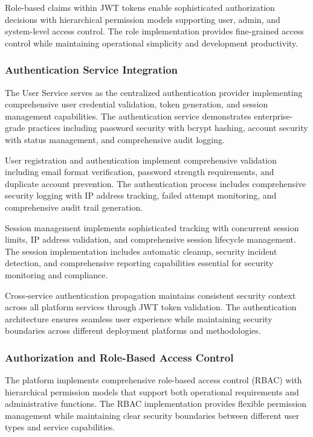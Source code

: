 Role-based claims within JWT tokens enable sophisticated authorization decisions with hierarchical permission models supporting user, admin, and system-level access control. The role implementation provides fine-grained access control while maintaining operational simplicity and development productivity.

\subsubsection{Authentication Service Integration}

The User Service serves as the centralized authentication provider implementing comprehensive user credential validation, token generation, and session management capabilities. The authentication service demonstrates enterprise-grade practices including password security with bcrypt hashing, account security with status management, and comprehensive audit logging.

User registration and authentication implement comprehensive validation including email format verification, password strength requirements, and duplicate account prevention. The authentication process includes comprehensive security logging with IP address tracking, failed attempt monitoring, and comprehensive audit trail generation.

Session management implements sophisticated tracking with concurrent session limits, IP address validation, and comprehensive session lifecycle management. The session implementation includes automatic cleanup, security incident detection, and comprehensive reporting capabilities essential for security monitoring and compliance.

Cross-service authentication propagation maintains consistent security context across all platform services through JWT token validation. The authentication architecture ensures seamless user experience while maintaining security boundaries across different deployment platforms and methodologies.

\subsubsection{Authorization and Role-Based Access Control}

The platform implements comprehensive role-based access control (RBAC) with hierarchical permission models that support both operational requirements and administrative functions. The RBAC implementation provides flexible permission management while maintaining clear security boundaries between different user types and service capabilities.

